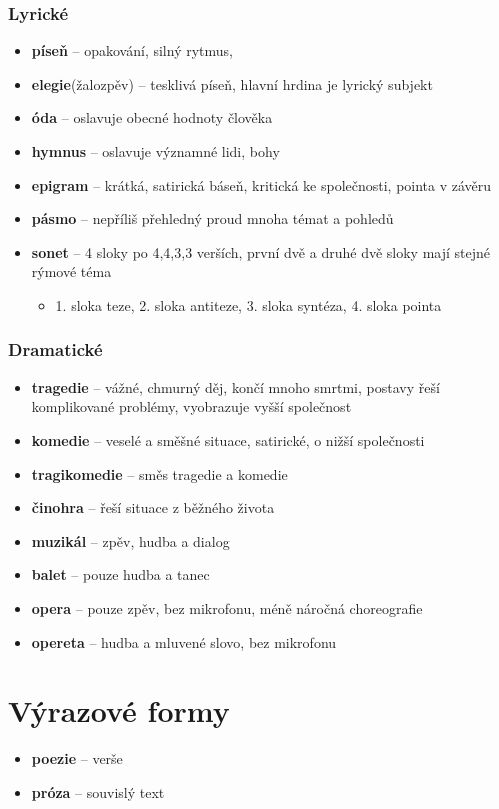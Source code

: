 \documentclass[10pt,a4paper]{article}
\begin{document}
\subsubsection{Lyrické}
\begin{itemize}
\item[] \textbf{píseň} -- opakování, silný rytmus, 
\item[] \textbf{elegie}(žalozpěv) -- tesklivá píseň, hlavní hrdina je lyrický subjekt
\item[] \textbf{óda} -- oslavuje obecné hodnoty člověka
\item[] \textbf{hymnus} -- oslavuje významné lidi, bohy
\item[] \textbf{epigram} -- krátká, satirická báseň, kritická ke společnosti, pointa v závěru
\item[] \textbf{pásmo} -- nepříliš přehledný proud mnoha témat a pohledů 
\item[] \textbf{sonet} -- 4 sloky po 4,4,3,3 verších, první dvě a druhé dvě sloky mají stejné rýmové téma
\begin{itemize}
\item 1. sloka teze, 2. sloka antiteze, 3. sloka syntéza, 4. sloka pointa
\end{itemize}
\end{itemize}

\subsubsection{Dramatické}
\begin{itemize}
\item[] \textbf{tragedie} -- vážné, chmurný děj, končí mnoho smrtmi, postavy řeší komplikované problémy, vyobrazuje vyšší společnost
\item[] \textbf{komedie} -- veselé a směšné situace, satirické, o nižší společnosti
\item[] \textbf{tragikomedie} -- směs tragedie a komedie
\item[] \textbf{činohra} -- řeší situace z běžného života
\item[] \textbf{muzikál} -- zpěv, hudba a dialog
\item[] \textbf{balet} -- pouze hudba a tanec
\item[] \textbf{opera} -- pouze zpěv, bez mikrofonu, méně náročná choreografie
\item[] \textbf{opereta} -- hudba a mluvené slovo, bez mikrofonu
\end{itemize}


\section{Výrazové formy}
\begin{itemize}
\item[] \textbf{poezie} -- verše
\item[] \textbf{próza} -- souvislý text
\end{itemize}
\end{document}
